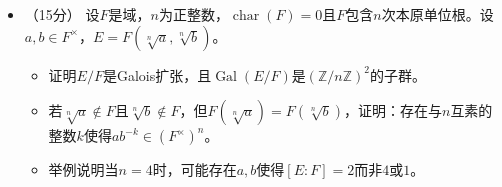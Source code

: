 \begin{itemize}
\item[七、]（15分）
设$F$是域，$n$为正整数，$\operatorname{char}(F)=0$且$F$包含$n$次本原单位根。设$a,b\in F^\times$，$E=F(\sqrt[n]{a},\sqrt[n]{b})$。
\begin{itemize}
    \item[(1)] 证明$E/F$是Galois扩张，且$\operatorname{Gal}(E/F)$是$(\mathbb{Z}/n\mathbb{Z})^2$的子群。
    \item[(2)] 若$\sqrt[n]{a}\notin F$且$\sqrt[n]{b}\notin F$，但$F(\sqrt[n]{a})=F(\sqrt[n]{b})$，证明：存在与$n$互素的整数$k$使得$ab^{-k}\in (F^\times)^n$。
    \item[(3)] 举例说明当$n=4$时，可能存在$a,b$使得$[E:F]=2$而非$4$或$1$。
\end{itemize}
\end{itemize}